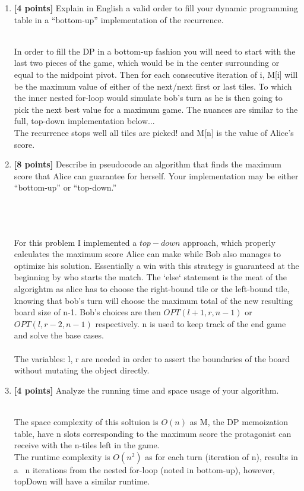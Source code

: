 \documentclass[11pt]{article}
\theoremstyle{definition}
\theoremstyle{theorem}
\newcommand{\solution}{\medskip\noindent{\color{DarkBlue}\textbf{Solution:}}}
\begin{document}
\begin{enumerate}[label=(\alph*)]
\item  \textbf{[4 points]} Explain in English a valid order to fill your dynamic programming table in a ``bottom-up'' implementation of the recurrence.

\solution \\

In order to fill the DP in a bottom-up fashion you will need to start with the last two pieces of the game, 
which would be in the center surrounding or equal to the midpoint pivot. Then for each consecutive iteration of i, M[i] will be the maximum value of either of the next/next first or last tiles. To which the inner nested for-loop would simulate bob's turn as he is then going to pick the next best value for a maximum game. The nuances are similar to the full, top-down implementation below...\\
The recurrence stops well all tiles are picked! and M[n] is the value of Alice's score.



\item  \textbf{[8 points]} Describe in pseudocode an algorithm that finds the maximum score that Alice can guarantee for herself.  Your implementation may be either ``bottom-up'' or ``top-down.''

\solution \\

 \\\\

For this problem I implemented a $top-down$ approach, 
which properly calculates the maximum score Alice can make while Bob also manages to optimize his solution. Essentially a win with this strategy is guaranteed at the beginning by who starts the match.
The `else` statement is the meat of the algorightm as alice has to choose the right-bound tile or the left-bound tile, knowing that bob's turn will choose the maximum total of the new resulting board size of n-1.
Bob's choices are then $OPT(l+1, r, n-1)$ or $OPT(l, r-2, n-1)$ respectively. n is used to keep track of the end game and solve the base cases.\\\\
The variables: l, r are needed in order to assert the boundaries of the board without mutating the object directly.\\

\item  \textbf{[4 points]} Analyze the running time and space usage of your algorithm.

\solution \\

The space complexity of this soltuion is $O(n)$ as M, the DP memoization table, have n slots corresponding to the maximum score the protagonist can receive with the n-tiles left in the game.\\

The runtime complexity is $O(n^2)$ as for each turn (iteration of n), results in a ~n iterations from the nested for-loop (noted in bottom-up), however, topDown will have a similar runtime. 

\end{enumerate}
\end{document}
